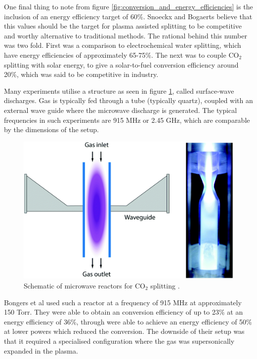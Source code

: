 One final thing to note from figure \ref{fig:conversion_and_energy_efficiencies} is the inclusion of an energy efficiency target of 60\%. Snoeckx and Bogaerts believe that this values should be the target for plasma assisted splitting to be competitive and worthy alternative to traditional methods. The rational behind this number was two fold. First was a comparison to electrochemical water splitting, which have energy efficiencies of approximately 65-75\%. The next was to couple CO$_2$ splitting with solar energy, to give a solar-to-fuel conversion efficiency around 20\%, which was said to be competitive in industry. 

Many experiments utilise a structure as seen in figure \ref{fig:mw_reactor}, called surface-wave discharges. Gas is typically fed through a tube (typically quartz), coupled with an external wave guide where the microwave discharge is generated. The typical frequencies in such experiments are 915 MHz or 2.45 GHz, which are comparable by the dimensions of the setup. 

\begin{figure}[h!]
	\centering
	\includegraphics[width=0.75\linewidth]{chapter_3/figures/mw_reactor.png}
	\caption{Schematic of microwave reactors for CO$_2$ splitting \cite{Snoeckx2017}.}
	\label{fig:mw_reactor}
\end{figure}

Bongers et al used such a reactor \cite{Bongers2015DevelopmentsIC} at a frequency of 915 MHz at approximately 150 Torr. They were able to obtain an conversion efficiency of up to 23\% at an energy efficiency of 36\%, through were able to achieve an energy efficiency of 50\% at lower powers which reduced the conversion. The downside of their setup was that it required a specialised configuration where the gas was supersonically expanded in the plasma.

\newpage

